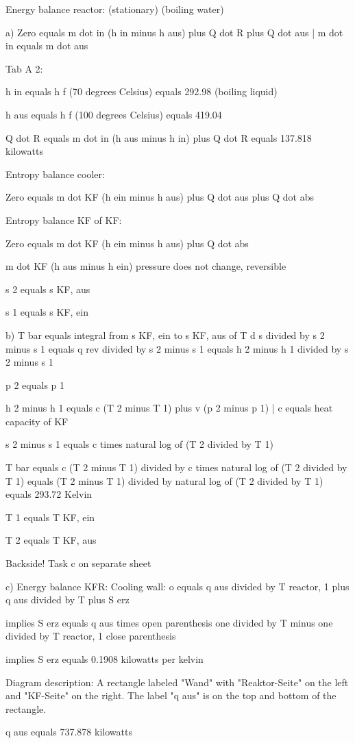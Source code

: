 Energy balance reactor: (stationary) (boiling water)

a) 
Zero equals m dot in (h in minus h aus) plus Q dot R plus Q dot aus | m dot in equals m dot aus

Tab A 2:

h in equals h f (70 degrees Celsius) equals 292.98 (boiling liquid)

h aus equals h f (100 degrees Celsius) equals 419.04

Q dot R equals m dot in (h aus minus h in) plus Q dot R equals 137.818 kilowatts

Entropy balance cooler:

Zero equals m dot KF (h ein minus h aus) plus Q dot aus plus Q dot abs

Entropy balance KF of KF:

Zero equals m dot KF (h ein minus h aus) plus Q dot abs

m dot KF (h aus minus h ein) pressure does not change, reversible

s 2 equals s KF, aus

s 1 equals s KF, ein

b) 
T bar equals integral from s KF, ein to s KF, aus of T d s divided by s 2 minus s 1 equals q rev divided by s 2 minus s 1 equals h 2 minus h 1 divided by s 2 minus s 1

p 2 equals p 1

h 2 minus h 1 equals c (T 2 minus T 1) plus v (p 2 minus p 1) | c equals heat capacity of KF

s 2 minus s 1 equals c times natural log of (T 2 divided by T 1)

T bar equals c (T 2 minus T 1) divided by c times natural log of (T 2 divided by T 1) equals (T 2 minus T 1) divided by natural log of (T 2 divided by T 1) equals 293.72 Kelvin

T 1 equals T KF, ein

T 2 equals T KF, aus

Backside! Task c on separate sheet

c) Energy balance KFR: Cooling wall:
o equals q aus divided by T reactor, 1 plus q aus divided by T plus S erz

implies S erz equals q aus times open parenthesis one divided by T minus one divided by T reactor, 1 close parenthesis

implies S erz equals 0.1908 kilowatts per kelvin

Diagram description:
A rectangle labeled "Wand" with "Reaktor-Seite" on the left and "KF-Seite" on the right. The label "q aus" is on the top and bottom of the rectangle.

q aus equals 737.878 kilowatts